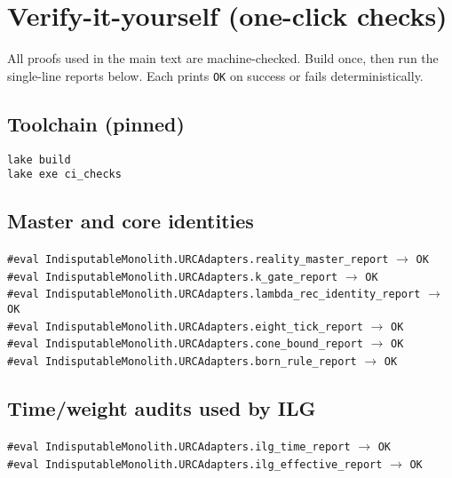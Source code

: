 \documentclass[12pt,a4paper]{article}
\begin{document}
\appendix

\section{Verify-it-yourself (one-click checks)}
\label{app:verify}
All proofs used in the main text are machine-checked. Build once, then run the single-line reports below. Each prints \texttt{OK} on success or fails deterministically.

\subsection*{Toolchain (pinned)}
\noindent\texttt{lake build}\\
\noindent\texttt{lake exe ci\_checks}

\subsection*{Master and core identities}
\noindent\texttt{\#eval IndisputableMonolith.URCAdapters.reality\_master\_report} \hfill \(\to\) \texttt{OK}\\
\texttt{\#eval IndisputableMonolith.URCAdapters.k\_gate\_report} \hfill \(\to\) \texttt{OK}\\
\texttt{\#eval IndisputableMonolith.URCAdapters.lambda\_rec\_identity\_report} \hfill \(\to\) \texttt{OK}\\
\texttt{\#eval IndisputableMonolith.URCAdapters.eight\_tick\_report} \hfill \(\to\) \texttt{OK}\\
\texttt{\#eval IndisputableMonolith.URCAdapters.cone\_bound\_report} \hfill \(\to\) \texttt{OK}\\
\texttt{\#eval IndisputableMonolith.URCAdapters.born\_rule\_report} \hfill \(\to\) \texttt{OK}

\subsection*{Time/weight audits used by ILG}
\noindent\texttt{\#eval IndisputableMonolith.URCAdapters.ilg\_time\_report} \hfill \(\to\) \texttt{OK}\\
\texttt{\#eval IndisputableMonolith.URCAdapters.ilg\_effective\_report} \hfill \(\to\) \texttt{OK}
\end{document}
